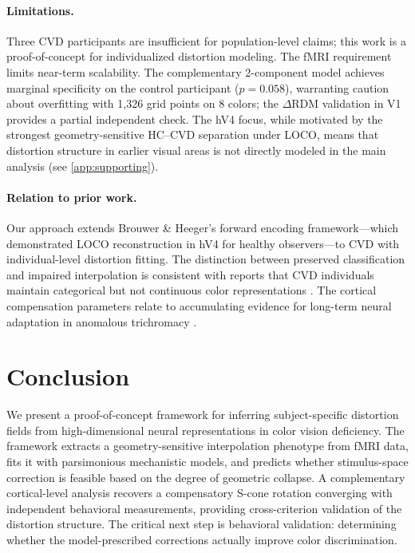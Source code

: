 \documentclass{article}
\begin{document}
\paragraph{Limitations.}
Three CVD participants are insufficient for population-level claims; this work is a proof-of-concept for individualized distortion modeling.
The fMRI requirement limits near-term scalability.
The complementary 2-component model achieves marginal specificity on the control participant ($p = 0.058$), warranting caution about overfitting with 1,326 grid points on 8 colors; the $\Delta$RDM validation in V1 provides a partial independent check.
The hV4 focus, while motivated by the strongest geometry-sensitive HC--CVD separation under LOCO, means that distortion structure in earlier visual areas is not directly modeled in the main analysis (see \cref{app:supporting}).

\paragraph{Relation to prior work.}
Our approach extends Brouwer \& Heeger's \citep{brouwer2009} forward encoding framework---which demonstrated LOCO reconstruction in hV4 for healthy observers---to CVD with individual-level distortion fitting.
The distinction between preserved classification and impaired interpolation is consistent with reports that CVD individuals maintain categorical but not continuous color representations \citep{bannert2018}.
The cortical compensation parameters relate to accumulating evidence for long-term neural adaptation in anomalous trichromacy \citep{tregillus2021, emery2021}.

\section{Conclusion}
\label{sec:conclusion}

We present a proof-of-concept framework for inferring subject-specific distortion fields from high-dimensional neural representations in color vision deficiency.
The framework extracts a geometry-sensitive interpolation phenotype from fMRI data, fits it with parsimonious mechanistic models, and predicts whether stimulus-space correction is feasible based on the degree of geometric collapse.
A complementary cortical-level analysis recovers a compensatory S-cone rotation converging with independent behavioral measurements, providing cross-criterion validation of the distortion structure.
The critical next step is behavioral validation: determining whether the model-prescribed corrections actually improve color discrimination.
\end{document}
